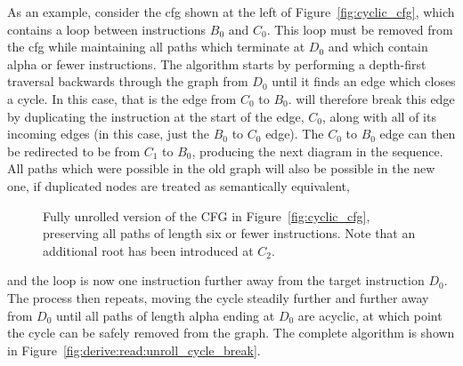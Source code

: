 As an example, consider the \gls{cfg} shown at the left of
Figure~\ref{fig:cyclic_cfg}, which contains a loop between
instructions $B_0$ and $C_0$.  This loop must be removed from the
\gls{cfg} while maintaining all paths which terminate at $D_0$ and
which contain \gls{alpha} or fewer instructions.  The algorithm starts
by performing a depth-first traversal backwards through the graph from
$D_0$ until it finds an edge which closes a cycle.  In this case, that
is the edge from $C_0$ to $B_0$.  {\Technique} will therefore break
this edge by duplicating the instruction at the start of the edge,
$C_0$, along with all of its incoming edges (in this case, just the
$B_0$ to $C_0$ edge).  The $C_0$ to $B_0$ edge can then be redirected
to be from $C_1$ to $B_0$, producing the next diagram in the sequence.
All paths which were possible in the old graph will also be possible
in the new one, if duplicated nodes are treated as semantically
equivalent,
\begin{wrapfigure}{O}{3.9cm}
\vspace{-8pt}
\begin{mdframed}
\caption{Fully unrolled version of the CFG in
  Figure~\ref{fig:cyclic_cfg}, preserving all paths of length six or
  fewer instructions.  Note that an additional root has been
  introduced at $C_2$.}
\label{fig:unrolled_cyclic_cfg}
\end{mdframed}
\vspace{-20pt}
\end{wrapfigure}
and the loop is now one instruction further away from the target
instruction $D_0$.  The process then repeats, moving the cycle
steadily further and further away from $D_0$ until all paths of length
\gls{alpha} ending at $D_0$ are acyclic, at which point the cycle can
be safely removed from the graph.  The complete algorithm is shown in
Figure~\ref{fig:derive:read:unroll_cycle_break}.


